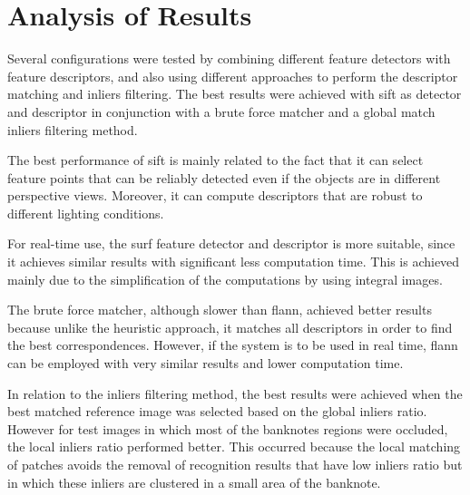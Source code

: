 \section{Analysis of Results}\label{sec:results-analysis}

Several configurations were tested by combining different feature detectors with feature descriptors, and also using different approaches to perform the descriptor matching and inliers filtering. The best results were achieved with \gls{sift} as detector and descriptor in conjunction with a brute force matcher and a global match inliers filtering method.

The best performance of \gls{sift} is mainly related to the fact that it can select feature points that can be reliably detected even if the objects are in different perspective views. Moreover, it can compute descriptors that are robust to different lighting conditions.

For real-time use, the \gls{surf} feature detector and descriptor is more suitable, since it achieves similar results with significant less computation time. This is achieved mainly due to the simplification of the computations by using integral images.

The brute force matcher, although slower than \gls{flann}, achieved better results because unlike the heuristic approach, it matches all descriptors in order to find the best correspondences. However, if the system is to be used in real time, \gls{flann} can be employed with very similar results and lower computation time.

In relation to the inliers filtering method, the best results were achieved when the best matched reference image was selected based on the global inliers ratio. However for test images in which most of the banknotes regions were occluded, the local inliers ratio performed better. This occurred because the local matching of patches avoids the removal of recognition results that have low inliers ratio but in which these inliers are clustered in a small area of the banknote.
